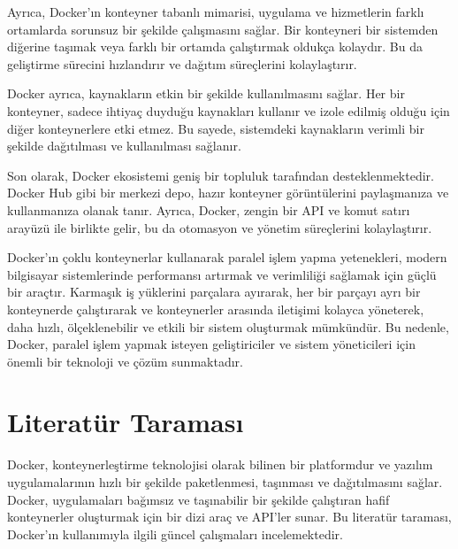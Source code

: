 Ayrıca, Docker'ın konteyner tabanlı mimarisi, uygulama ve hizmetlerin farklı ortamlarda sorunsuz bir şekilde çalışmasını sağlar. Bir konteyneri bir sistemden diğerine taşımak veya farklı bir ortamda çalıştırmak oldukça kolaydır. Bu da geliştirme sürecini hızlandırır ve dağıtım süreçlerini kolaylaştırır.

Docker ayrıca, kaynakların etkin bir şekilde kullanılmasını sağlar. Her bir konteyner, sadece ihtiyaç duyduğu kaynakları kullanır ve izole edilmiş olduğu için diğer konteynerlere etki etmez. Bu sayede, sistemdeki kaynakların verimli bir şekilde dağıtılması ve kullanılması sağlanır.

Son olarak, Docker ekosistemi geniş bir topluluk tarafından desteklenmektedir. Docker Hub gibi bir merkezi depo, hazır konteyner görüntülerini paylaşmanıza ve kullanmanıza olanak tanır. Ayrıca, Docker, zengin bir API ve komut satırı arayüzü ile birlikte gelir, bu da otomasyon ve yönetim süreçlerini kolaylaştırır.

Docker'ın çoklu konteynerlar kullanarak paralel işlem yapma yetenekleri, modern bilgisayar sistemlerinde performansı artırmak ve verimliliği sağlamak için güçlü bir araçtır. Karmaşık iş yüklerini parçalara ayırarak, her bir parçayı ayrı bir konteynerde çalıştırarak ve konteynerler arasında iletişimi kolayca yöneterek, daha hızlı, ölçeklenebilir ve etkili bir sistem oluşturmak mümkündür. Bu nedenle, Docker, paralel işlem yapmak isteyen geliştiriciler ve sistem yöneticileri için önemli bir teknoloji ve çözüm sunmaktadır.
\section{Literatür Taraması}
Docker, konteynerleştirme teknolojisi olarak bilinen bir platformdur ve yazılım uygulamalarının hızlı bir şekilde paketlenmesi, taşınması ve dağıtılmasını sağlar. Docker, uygulamaları bağımsız ve taşınabilir bir şekilde çalıştıran hafif konteynerler oluşturmak için bir dizi araç ve API'ler sunar. Bu literatür taraması, Docker'ın kullanımıyla ilgili güncel çalışmaları incelemektedir.\\
